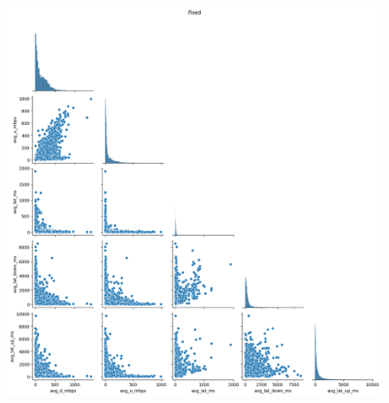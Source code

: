 \documentclass[
  letterpaper,
  DIV=11,
  numbers=noendperiod,
  oneside]{scrartcl}
\begin{document}
\begin{figure}
\begin{minipage}[t]{0.50\linewidth}
{{\includegraphics{data-analytics_files/figure-latex/fig-orgpairs-output-2.png}

}

}

\end{minipage}%
%
\begin{minipage}[t]{0.50\linewidth}

{\centering 

}
\end{minipage}
\end{figure}
\end{document}
